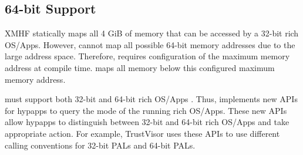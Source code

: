 \subsection{64-bit Support}
\label{sec:design_impl_64bit}

XMHF statically maps all 4 GiB of memory that can be accessed by a 32-bit rich OS/Apps. However,  cannot map all possible 64-bit memory addresses due to the large address space. Therefore,  requires configuration of the maximum memory address at compile time.  maps all memory below this configured maximum memory address.

 must support both 32-bit and 64-bit rich OS/Apps \cite{intel_sdm}. Thus,  implements new APIs for hypapps to query the mode of the running rich OS/Apps. These new APIs allow hypapps to distinguish between 32-bit and 64-bit rich OS/Apps and take appropriate action. For example, TrustVisor uses these APIs to use different calling conventions for 32-bit PALs and 64-bit PALs.

